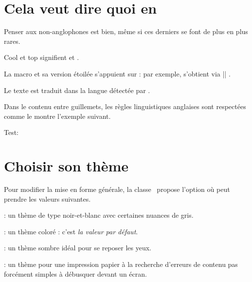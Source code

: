 \section{Cela veut dire quoi en }

Penser aux non-anglophones est bien, même si ces derniers se font de plus en plus rares.

\begin{tdoclatex}
Cool et top signifient  et .
\end{tdoclatex}


La macro  et sa version étoilée s'appuient sur  : par exemple,  s'obtient via \tdoclatexin|| .


\begin{tdocnote}
    Le texte  est traduit dans la langue détectée par \thisproj.
\end{tdocnote}


Dans le contenu entre guillemets, les règles linguistiques anglaises sont respectées comme le montre l'exemple suivant.

\begin{tdoclatex}
Test: 

\end{tdoclatex}


\section{Choisir son thème}

Pour modifier la mise en forme générale, la classe \thisproj\ propose l'option  où  peut prendre les valeurs suivantes.

\begin{tasks}[style=itemize]
    \task {}:
          un thème de type noir-et-blanc avec certaines nuances de gris.

    \task {}:
          un thème coloré : c'est \emph{la valeur par défaut}.

    \task {}:
          un thème sombre idéal pour se reposer les yeux.

    \task {}:
          un thème pour une impression papier à la recherche d'erreurs de contenu pas forcément simples à débusquer devant un écran.
\end{tasks}


